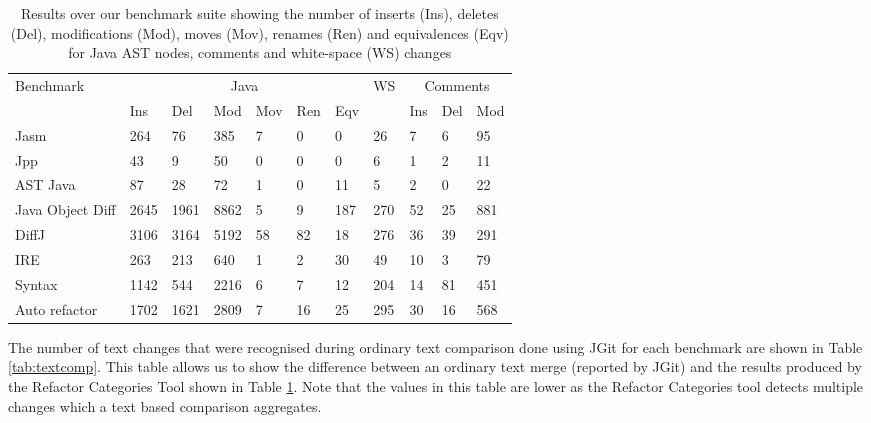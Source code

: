 \begin{table}[t!]
    \small
    \begin{tabular}{l|llllll|l|lll}
    Benchmark        & \multicolumn{6}{|c|}{Java}           & WS & \multicolumn{3}{|c}{Comments} \\ \cline{2-7} \cline{9-11}
    ~                & Ins  & Del  & Mod  & Mov & Ren & Eqv & ~          & Ins      & Del & Mod  \\ \hline
    Jasm             & 264  & 76   & 385  & 7   & 0   & 0   & 26         & 7        & 6   & 95   \\
    Jpp              & 43   & 9    & 50   & 0   & 0   & 0   & 6          & 1        & 2   & 11   \\
    AST Java         & 87   & 28   & 72   & 1   & 0   & 11  & 5          & 2        & 0   & 22   \\
    \begin{minipage}[t]{0.15\textwidth}Java Object Diff\end{minipage} & 2645 & 1961 & 8862 & 5   & 9   & 187 & 270        & 52       & 25 & 881 \\
    DiffJ            & 3106 & 3164 & 5192 & 58  & 82  & 18  & 276        & 36       & 39  & 291  \\
    IRE              & 263  & 213  & 640  & 1   & 2   & 30  & 49         & 10       & 3   & 79   \\
    Syntax           & 1142 & 544  & 2216 & 6   & 7   & 12  & 204        & 14       & 81  & 451  \\
    Auto refactor    & 1702 & 1621 & 2809 & 7   & 16  & 25  & 295        & 30       & 16  & 568  \\
    \end{tabular}
    \caption{Results over our benchmark suite showing the number of inserts (Ins), deletes (Del), modifications (Mod), moves (Mov), renames (Ren) and equivalences (Eqv) for Java AST nodes, comments and white-space (WS) changes}
    \label{tab:results}
\end{table}

The number of text changes that were recognised during ordinary text comparison done using JGit for each benchmark are shown in Table \ref{tab:textcomp}. This table allows us to show the difference between an ordinary text merge (reported by JGit) and the results produced by the Refactor Categories Tool shown in Table \ref{tab:results}. Note that the values in this table are lower as the Refactor Categories tool detects multiple changes which a text based comparison aggregates.  

